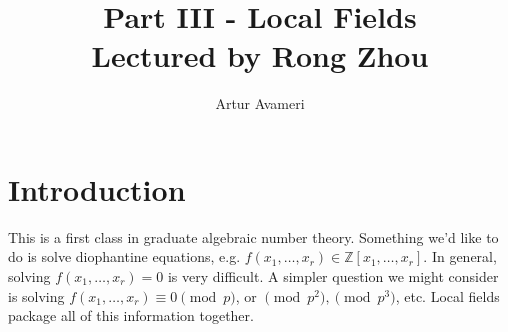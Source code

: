 \documentclass{article}
\title{Part III - Local Fields
    \\ \large
    Lectured by Rong Zhou 
}
\author{Artur Avameri}
\date{}
\theoremstyle{definition}
\begin{document}
\maketitle
\tableofcontents
\newpage
 
\section{Introduction}

This is a first class in graduate algebraic number theory. Something we'd like to do is solve diophantine equations, e.g. $f(x_1,\ldots,x_r) \in \mathbb{Z}[x_1,\ldots,x_r]$. In general, solving $f(x_1,\ldots,x_r) = 0$ is very difficult. A simpler question we might consider is solving $f(x_1,\ldots,x_r) \equiv 0 \pmod{p}$, or $\pmod{p^2}, \pmod{p^3}$, etc. Local fields package all of this information together. 
\end{document}
